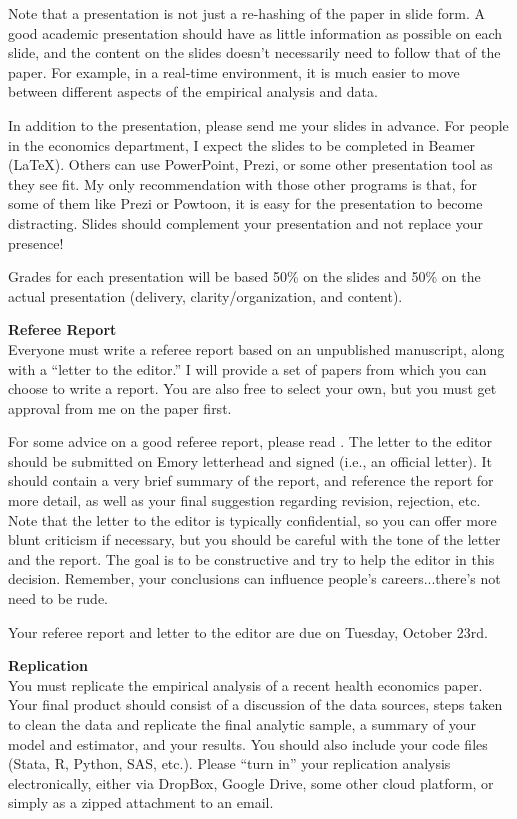 \documentclass{article}
\begin{document}
Note that a presentation is not just a re-hashing of the paper in slide form. A good academic presentation should have as little information as possible on each slide, and the content on the slides doesn't necessarily need to follow that of the paper. For example, in a real-time environment, it is much easier to move between different aspects of the empirical analysis and data.

In addition to the presentation, please send me your slides in advance. For people in the economics department, I expect the slides to be completed in Beamer (LaTeX). Others can use PowerPoint, Prezi, or some other presentation tool as they see fit. My only recommendation with those other programs is that, for some of them like Prezi or Powtoon, it is easy for the presentation to become distracting. Slides should complement your presentation and not replace your presence!

Grades for each presentation will be based 50\% on the slides and 50\% on the actual presentation (delivery, clarity/organization, and content).

\medskip
\noindent \textbf{Referee Report} \\
Everyone must write a referee report based on an unpublished manuscript, along with a ``letter to the editor.'' I will provide a set of papers from which you can choose to write a report. You are also free to select your own, but you must get approval from me on the paper first.

For some advice on a good referee report, please read \cite{berk2017}. The letter to the editor should be submitted on Emory letterhead and signed (i.e., an official letter). It should contain a very brief summary of the report, and reference the report for more detail, as well as your final suggestion regarding revision, rejection, etc. Note that the letter to the editor is typically confidential, so you can offer more blunt criticism if necessary, but you should be careful with the tone of the letter and the report. The goal is to be constructive and try to help the editor in this decision. Remember, your conclusions can influence people's careers...there's not need to be rude.

Your referee report and letter to the editor are due on Tuesday, October 23rd.

\medskip
\noindent \textbf{Replication} \\
You must replicate the empirical analysis of a recent health economics paper. Your final product should consist of a discussion of the data sources, steps taken to clean the data and replicate the final analytic sample, a summary of your model and estimator, and your results. You should also include your code files (Stata, R, Python, SAS, etc.). Please ``turn in'' your replication analysis electronically, either via DropBox, Google Drive, some other cloud platform, or simply as a zipped attachment to an email.
\end{document}
